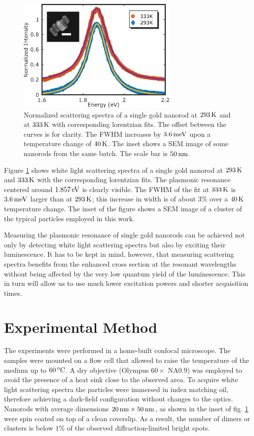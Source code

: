 \begin{figure}[tp] \centering
\includegraphics[width=78mm]{Chapters/05_WhiteLight/Figures/01_Spectra_Example/01_Spectra_Example.png}
\caption{Normalized scattering spectra of a single gold nanorod at $293\,\textrm{K}$ and
at $333\,\textrm{K}$ with corresponding lorentzian fits. The offset between the curves is for
clarity. The FWHM increases by $3.6\,\textrm{meV}$ upon a temperature change of $40\,\textrm{K}$.
The inset shows a SEM image of some nanorods from the same batch. The scale bar
is $50\,\textrm{nm}$.}
	\label{fig:scattering_spectra}
\end{figure}

Figure \ref{fig:scattering_spectra} shows white light scattering spectra of a single
gold nanorod at $293\,\textrm{K}$ and $333\,\textrm{K}$ with the corresponding lorentzian fits. The
plasmonic resonance centered around $1.857\,\textrm{eV}$ is clearly visible. The FWHM of
the fit at $333\,\textrm{K}$ is $3.6\,\textrm{meV}$ larger than at $293\,\textrm{K}$; this increase in width
is of about $3\%$ over a $40\,\textrm{K}$ temperature change. The inset of the figure
shows a SEM image of a cluster of the typical particles employed in this work.

Measuring the plasmonic resonance of single gold nanorods can be achieved not
only by detecting white light scattering spectra but also by exciting their
luminescence\cite{Konrad2013}. It has to be kept in mind, however, that
measuring scattering spectra benefits from the enhanced cross section at the
resonant wavelengths without being affected by the very low quantum yield of the
luminescence\cite{Yorulmaz2012}. This in turn will allow us to use much lower
excitation powers and shorter acquisition times.

\section{Experimental Method}

The experiments were performed in a home-built confocal microscope. The samples
were mounted on a flow cell that allowed to raise the temperature of the
medium up to $60\,^o\textrm{C}$. A dry objective (Olympus $60\times$ NA$0.9$) was
employed to avoid the presence of a heat sink close to the observed area. To
acquire white light scattering spectra the particles were immersed in index
matching oil, therefore achieving a dark-field configuration without changes to
the optics. Nanorods with average dimensions $20\,\textrm{nm}\times50\,\textrm{nm}$, as shown in the
inset of fig. \ref{fig:scattering_spectra} were spin coated on top of a clean
coverslip. As a result, the number of dimers or clusters is below $1\%$ of the
observed diffraction-limited bright spots.

